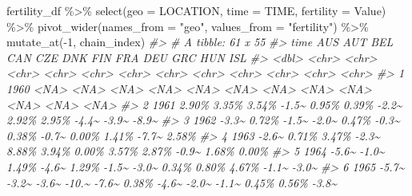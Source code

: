 \documentclass[
]{article}
\newenvironment{Shaded}{\begin{snugshade}}{\end{snugshade}}
\newcommand{\AttributeTok}[1]{\textcolor[rgb]{0.77,0.63,0.00}{#1}}
\newcommand{\CommentTok}[1]{\textcolor[rgb]{0.56,0.35,0.01}{\textit{#1}}}
\newcommand{\DecValTok}[1]{\textcolor[rgb]{0.00,0.00,0.81}{#1}}
\newcommand{\FunctionTok}[1]{\textcolor[rgb]{0.00,0.00,0.00}{#1}}
\newcommand{\NormalTok}[1]{#1}
\newcommand{\SpecialCharTok}[1]{\textcolor[rgb]{0.00,0.00,0.00}{#1}}
\newcommand{\StringTok}[1]{\textcolor[rgb]{0.31,0.60,0.02}{#1}}
\begin{document}
\begin{Shaded}
\begin{Highlighting}[]
\NormalTok{fertility\_df }\SpecialCharTok{\%\textgreater{}\%} 
  \FunctionTok{select}\NormalTok{(}\AttributeTok{geo =}\NormalTok{ LOCATION, }\AttributeTok{time =}\NormalTok{ TIME, }\AttributeTok{fertility =}\NormalTok{ Value) }\SpecialCharTok{\%\textgreater{}\%} 
  \FunctionTok{pivot\_wider}\NormalTok{(}\AttributeTok{names\_from =} \StringTok{"geo"}\NormalTok{, }\AttributeTok{values\_from =} \StringTok{"fertility"}\NormalTok{) }\SpecialCharTok{\%\textgreater{}\%} 
  \FunctionTok{mutate\_at}\NormalTok{(}\SpecialCharTok{{-}}\DecValTok{1}\NormalTok{, chain\_index)}
\CommentTok{\#\textgreater{} \# A tibble: 61 x 55}
\CommentTok{\#\textgreater{}     time AUS   AUT   BEL   CAN   CZE   DNK   FIN   FRA   DEU   GRC   HUN   ISL  }
\CommentTok{\#\textgreater{}    \textless{}dbl\textgreater{} \textless{}chr\textgreater{} \textless{}chr\textgreater{} \textless{}chr\textgreater{} \textless{}chr\textgreater{} \textless{}chr\textgreater{} \textless{}chr\textgreater{} \textless{}chr\textgreater{} \textless{}chr\textgreater{} \textless{}chr\textgreater{} \textless{}chr\textgreater{} \textless{}chr\textgreater{} \textless{}chr\textgreater{}}
\CommentTok{\#\textgreater{}  1  1960 \textless{}NA\textgreater{}  \textless{}NA\textgreater{}  \textless{}NA\textgreater{}  \textless{}NA\textgreater{}  \textless{}NA\textgreater{}  \textless{}NA\textgreater{}  \textless{}NA\textgreater{}  \textless{}NA\textgreater{}  \textless{}NA\textgreater{}  \textless{}NA\textgreater{}  \textless{}NA\textgreater{}  \textless{}NA\textgreater{} }
\CommentTok{\#\textgreater{}  2  1961 2.90\% 3.35\% 3.54\% {-}1.5\textasciitilde{} 0.95\% 0.39\% {-}2.2\textasciitilde{} 2.92\% 2.95\% {-}4.4\textasciitilde{} {-}3.9\textasciitilde{} {-}8.9\textasciitilde{}}
\CommentTok{\#\textgreater{}  3  1962 {-}3.3\textasciitilde{} 0.72\% {-}1.5\textasciitilde{} {-}2.0\textasciitilde{} 0.47\% {-}0.3\textasciitilde{} 0.38\% {-}0.7\textasciitilde{} 0.00\% 1.41\% {-}7.7\textasciitilde{} 2.58\%}
\CommentTok{\#\textgreater{}  4  1963 {-}2.6\textasciitilde{} 0.71\% 3.47\% {-}2.3\textasciitilde{} 8.88\% 3.94\% 0.00\% 3.57\% 2.87\% {-}0.9\textasciitilde{} 1.68\% 0.00\%}
\CommentTok{\#\textgreater{}  5  1964 {-}5.6\textasciitilde{} {-}1.0\textasciitilde{} 1.49\% {-}4.6\textasciitilde{} 1.29\% {-}1.5\textasciitilde{} {-}3.0\textasciitilde{} 0.34\% 0.80\% 4.67\% {-}1.1\textasciitilde{} {-}3.0\textasciitilde{}}
\CommentTok{\#\textgreater{}  6  1965 {-}5.7\textasciitilde{} {-}3.2\textasciitilde{} {-}3.6\textasciitilde{} {-}10.\textasciitilde{} {-}7.6\textasciitilde{} 0.38\% {-}4.6\textasciitilde{} {-}2.0\textasciitilde{} {-}1.1\textasciitilde{} 0.45\% 0.56\% {-}3.8\textasciitilde{}}

\end{Highlighting}
\end{Shaded}
\end{document}
